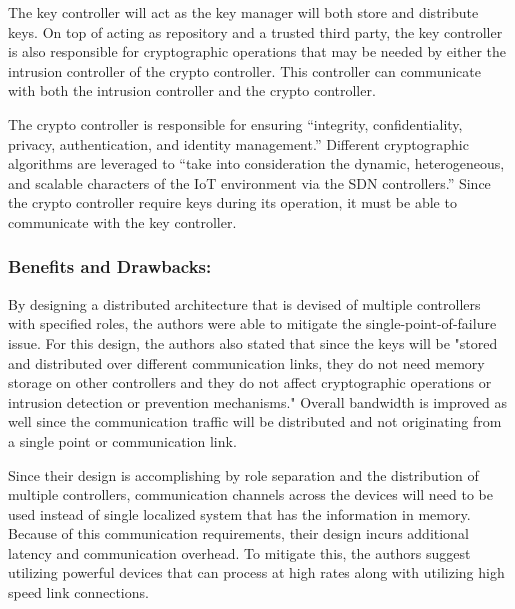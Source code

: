 \smallskip

The key controller will act as the key manager will both store and distribute keys. On top of acting as repository and a trusted third party, the key controller is also responsible for cryptographic operations that may be needed by either the intrusion controller of the crypto controller. This controller can communicate with both the intrusion controller and the crypto controller.

\smallskip

The crypto controller is responsible for ensuring “integrity, confidentiality, privacy, authentication, and identity management.” \cite {kalkan2017securing} Different cryptographic algorithms are leveraged to “take into consideration the dynamic, heterogeneous, and scalable characters of the IoT environment via the SDN controllers.” \cite {kalkan2017securing} Since the crypto controller require keys during its operation, it must be able to communicate with the key controller.

\subsubsection {Benefits and Drawbacks:}

By designing a distributed architecture that is devised of multiple controllers with specified roles, the authors were able to mitigate the single-point-of-failure issue. For this design, the authors also stated that since the keys will be "stored and distributed over different communication links, they do not need memory storage on other controllers and they do not affect cryptographic operations or intrusion detection or prevention mechanisms." \cite {kalkan2017securing} Overall bandwidth is improved as well since the communication traffic will be distributed and not originating from a single point or communication link.

\smallskip

Since their design is accomplishing by role separation and the distribution of multiple controllers, communication channels across the devices will need to be used instead of single localized system that has the information in memory. Because of this communication requirements, their design incurs additional latency and communication overhead. To mitigate this, the authors suggest utilizing powerful devices that can process at high rates along with utilizing high speed link connections. 

